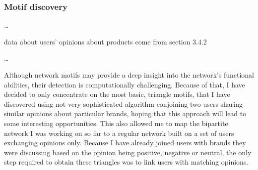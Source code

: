     \subsubsection{Motif discovery}
    
      \ldots
      
      data about users' opinions about products come from section 3.4.2
      
      \ldots
      
      Although network motifs may provide a deep insight into the network's functional abilities, their detection is computationally challenging. Because of that, I have decided to only concentrate on the most basic, triangle motifs, that I have discovered using not very sophisticated algorithm conjoining two users sharing similar opinions about particular brands, hoping that this approach will lead to some interesting opportunities. This also allowed me to map the bipartite network I was working on so far to a regular network built on a set of users exchanging opinions only. Because I have already joined users with brands they were discussing based on the opinion being positive, negative or neutral, the only step required to obtain these triangles was to link users with matching opinions. 
      
